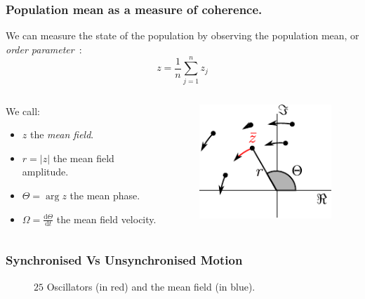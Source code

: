 \documentclass[10pt,reqno]{beamer}
\newcommand{\D}[2]{\frac{\mathrm{d} #1}{\mathrm{d} #2}}
\begin{document}
\begin{frame}
\frametitle{Population mean as a measure of coherence.}
We can measure the state of the population by observing the population mean, or {\em order parameter}~\cite{kuramoto75}:
\[
z = \frac{1}{n}\sum_{j=1}^n z_j
\]
\begin{columns}
\begin{column}{0.59\textwidth}
	We call:
	\begin{itemize}
		\item $z$ the {\em mean field}.
		\item $r=|z|$ the mean field amplitude.
		\item $\Theta = \arg{z}$ the mean phase.
		\item $\Omega = \D{\Theta}{t}$ the mean field velocity.
	\end{itemize}
\end{column}
\begin{column}{0.39\textwidth}
	\begin{figure}
		\includegraphics{meanfield.pdf}
	\end{figure}
\end{column}
\end{columns}
\end{frame}
\begin{frame}
\frametitle{Synchronised Vs Unsynchronised Motion}
\begin{figure}
	\caption{$25$ Oscillators (in red) and the mean field (in blue).}
\end{figure}
\end{frame}
\end{document}
